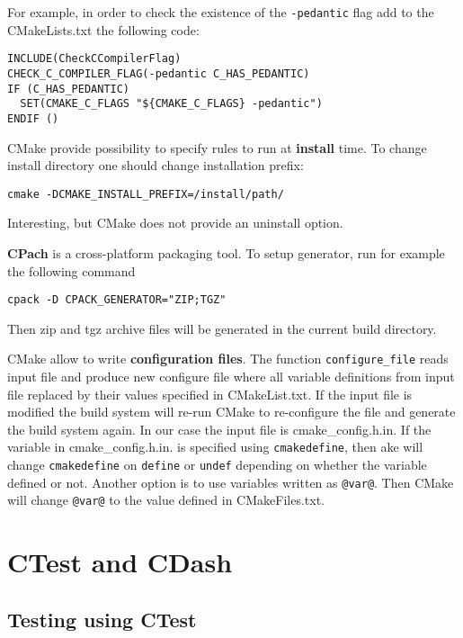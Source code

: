 \documentclass[a4paper,10pt]{article}
\begin{document}
For example, in order to check the existence of the \texttt{-pedantic} flag add to the CMakeLists.txt the following code:

\begin{verbatim}
INCLUDE(CheckCCompilerFlag)
CHECK_C_COMPILER_FLAG(-pedantic C_HAS_PEDANTIC)
IF (C_HAS_PEDANTIC)
  SET(CMAKE_C_FLAGS "${CMAKE_C_FLAGS} -pedantic")
ENDIF ()
\end{verbatim}


CMake provide possibility to specify rules to run at \textbf{install} time. 
To change install directory one should change installation prefix:
\begin{verbatim}
cmake -DCMAKE_INSTALL_PREFIX=/install/path/
\end{verbatim}
Interesting, but CMake does not provide an uninstall option. 



\textbf{CPach} is a cross-platform packaging tool. To setup generator, run for example the following command
\begin{verbatim}
cpack -D CPACK_GENERATOR="ZIP;TGZ" 
\end{verbatim}
Then zip and tgz archive files will be generated in the current build directory.



CMake allow to write \textbf{configuration files}. The function \texttt{configure\_file} reads input file and produce new configure file where all variable definitions from input file replaced by their values specified in CMakeList.txt. If the input file is modified the build system will re-run CMake to re-configure the file and generate the build system again. In our case the input file is cmake\_config.h.in.
If the variable in cmake\_config.h.in. is specified using \texttt{cmakedefine}, then ake will change \texttt{cmakedefine} on \texttt{define} or \texttt{undef} depending on whether the variable defined or not. Another option is to use variables written as \texttt{@var@}. Then CMake will change \texttt{@var@} to the value defined in CMakeFiles.txt.




\section{CTest and CDash}

\subsection{Testing using CTest}
\end{document}
